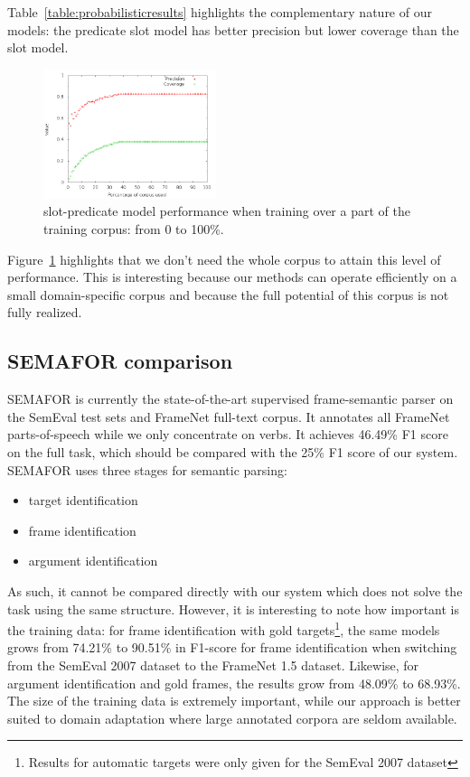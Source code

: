 Table~\ref{table:probabilisticresults} highlights the complementary nature of
our models: the predicate slot model has better precision but lower coverage
than the slot model.

\begin{figure}[t]
    \centering
    \includegraphics[width=0.45\textwidth]{fig/slot-predicate-percents.png}
    \caption{\label{fig:slot_predicate} slot-predicate model performance when training over a part of the training corpus: from 0 to 100\%.}
\end{figure}

Figure~\ref{fig:slot_predicate} highlights that we don't need the whole corpus
to attain this level of performance. This is interesting because our methods
can operate efficiently on a small domain-specific corpus and because the full
potential of this corpus is not fully realized.

\subsection{SEMAFOR comparison}

SEMAFOR \citep{das2013frame} is currently the state-of-the-art supervised
frame-semantic parser on the SemEval test sets and FrameNet full-text corpus.
It annotates all FrameNet parts-of-speech while we only concentrate on verbs.
It achieves 46.49\% F1 score on the full task, which should be compared with
the 25\% F1 score of our system.  SEMAFOR uses three stages for semantic
parsing:

\begin{itemize}
    \item target identification
    \item frame identification
    \item argument identification
\end{itemize}

As such, it cannot be compared directly with our system which does not solve
the task using the same structure. However, it is interesting to note how
important is the training data: for frame identification with gold
targets\footnote{Results for automatic targets were only given for the SemEval
2007 dataset}, the same models grows from 74.21\% to 90.51\% in F1-score for
frame identification when switching from the SemEval 2007 dataset to the
FrameNet 1.5 dataset. Likewise, for argument identification and gold
frames\footnotemark[\value{footnote}], the results grow from 48.09\% to
68.93\%. The size of the training data is extremely important, while our
approach is better suited to domain adaptation where large annotated corpora
are seldom available.

